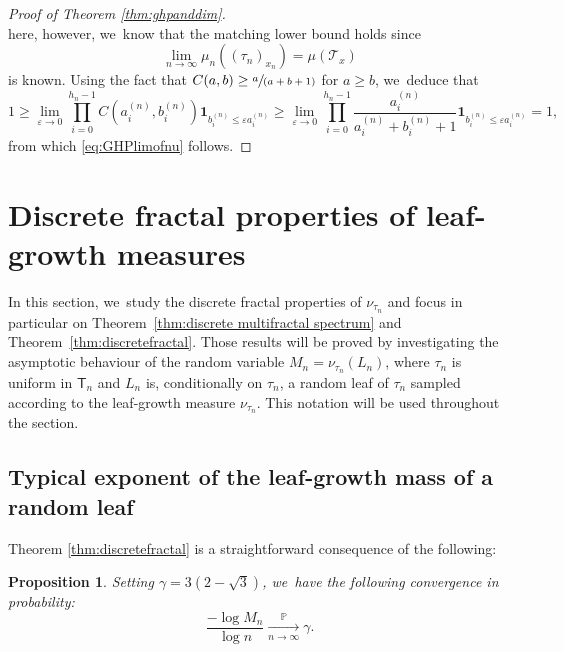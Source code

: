 \documentclass[JEP,XML,SOM,Unicode,NoFloatCountersInSection, NoEqCountersInSection,published]{cedram}
\newcommand{\spfrac}[2]{\sfrac{#1}{(#2)}}
\let\dH\gamma
\newcommand{\pr}{\mathbb{P}}
\newcommand{\sT}{\mathsf{T}}
\newtheorem{prop}[thm]{Proposition}
\theoremstyle{definition}
\begin{document}
\begin{proof}[Proof of Theorem \ref{thm:ghpanddim}]
\[\]
here, however, we~know that the matching lower bound holds since\vspace*{-3pt}
\[
\lim_{n \to \infty} \mu_n((\tau_n)_{x_n}) = \mu(\mathcal{T}_x)
\]
is known. Using the fact that $C(a,b) \geq \spfrac{a}{a+b+1}$ for $a \geq b$, we~deduce that\vspace*{-3pt}
\[
1\geq \lim_{\varepsilon \to 0} \prod_{i=0}^{h_n-1} C(a_i^{(n)}, b_i^{(n)})\mathbf{1}_{b_i^{(n)} \leq \varepsilon a_i^{(n)}} \geq \lim_{\varepsilon \to 0} \prod_{i=0}^{h_n-1} \frac{a_i^{(n)}}{a_i^{(n)}+b_i^{(n)}+1}\mathbf{1}_{b_i^{(n)} \leq \varepsilon a_i^{(n)}} = 1,
\]
from which \eqref{eq:GHPlimofnu} follows.
\end{proof}

\section{Discrete fractal properties of leaf-growth measures}
In this section, we~study the discrete fractal properties of $\nu_{\tau_n}$ and focus in particular on Theorem~\ref{thm:discrete multifractal spectrum} and Theorem~\ref{thm:discretefractal}. Those results will be proved by investigating the asymptotic behaviour of the random variable $M_n=\nu_{\tau_n}(L_n)$, where $\tau_n$ is uniform in $\sT_n$ and $L_n$ is, conditionally on $\tau_n$, a random leaf of $\tau_n$ sampled according to the leaf-growth measure $\nu_{\tau_n}$. This notation will be used throughout the section.

\subsection{Typical exponent of the leaf-growth mass of a random leaf}\label{section:discrete Hausdorff}
Theorem \ref{thm:discretefractal} is a straightforward consequence of the following:
\begin{prop}
Setting $\dH=3(2-\sqrt{3})$, we~have the following convergence in probability:\vspace*{-3pt}
\[
\frac{-\log M_n}{\log n} \xrightarrow[\textstyle n\to\infty]{\textstyle\pr}\dH.
\]
\end{prop}
\end{document}
